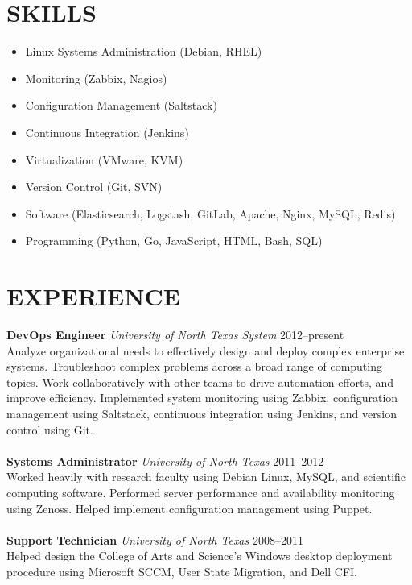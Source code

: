 \documentclass[line, margin,]{res}
\begin{document}
\address{215 E Oak St Apt 20 $\cdot$ Denton, TX 76201 $\cdot$ (940) 783-2400 $\cdot$ mtsanderson@gmail.com $\cdot$ github: mtsanderson}
 
\begin{resume}
\section{SKILLS}
\begin{itemize}[leftmargin=10pt]
    \item Linux Systems Administration (Debian, RHEL)
    \item Monitoring (Zabbix, Nagios)
    \item Configuration Management (Saltstack)
    \item Continuous Integration (Jenkins)
    \item Virtualization (VMware, KVM)
    \item Version Control (Git, SVN)
    \item Software (Elasticsearch, Logstash, GitLab, Apache, Nginx, MySQL, Redis)
    \item Programming (Python, Go, JavaScript, HTML, Bash, SQL)
\end{itemize}
 
\section{EXPERIENCE} 
\textbf{DevOps Engineer}
\textit{University of North Texas System} \hfill 2012--present \\ [5pt]
Analyze organizational needs to effectively design and deploy complex enterprise systems. Troubleshoot complex problems across a broad range of computing topics. Work collaboratively with other teams to drive automation efforts, and improve efficiency. Implemented system monitoring using Zabbix, configuration management using Saltstack, continuous integration using Jenkins, and version control using Git. \\ \\
\textbf{Systems Administrator}
\textit{University of North Texas} \hfill 2011--2012 \\ [5pt]
Worked heavily with research faculty using Debian Linux, MySQL, and scientific computing software. Performed server performance and availability monitoring using Zenoss. Helped implement configuration management using Puppet. \\ \\
\textbf{Support Technician}
\textit{University of North Texas} \hfill 2008--2011 \\ [5pt]
Helped design the College of Arts and Science's Windows desktop deployment procedure using Microsoft SCCM, User State Migration, and Dell CFI.


\end{resume}
\end{document}
